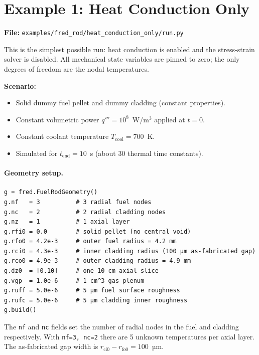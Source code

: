 \documentclass[11pt,a4paper]{article}
\begin{document}
\section{Example 1: Heat Conduction Only}
\label{sec:hco}

\textbf{File:} \texttt{examples/fred\_rod/heat\_conduction\_only/run.py}

\medskip
This is the simplest possible run: heat conduction is enabled and the
stress-strain solver is disabled.  All mechanical state variables are pinned
to zero; the only degrees of freedom are the nodal temperatures.

\textbf{Scenario:}
\begin{itemize}
  \item Solid dummy fuel pellet and dummy cladding (constant properties).
  \item Constant volumetric power $q''' = 10^8$~W/m$^3$ applied at $t=0$.
  \item Constant coolant temperature $T_\text{cool} = 700$~K.
  \item Simulated for $t_\text{end} = 10$~s (about 30 thermal time constants).
\end{itemize}

\paragraph{Geometry setup.}

\begin{lstlisting}
g = fred.FuelRodGeometry()
g.nf   = 3          # 3 radial fuel nodes
g.nc   = 2          # 2 radial cladding nodes
g.nz   = 1          # 1 axial layer
g.rfi0 = 0.0        # solid pellet (no central void)
g.rfo0 = 4.2e-3     # outer fuel radius = 4.2 mm
g.rci0 = 4.3e-3     # inner cladding radius (100 µm as-fabricated gap)
g.rco0 = 4.9e-3     # outer cladding radius = 4.9 mm
g.dz0  = [0.10]     # one 10 cm axial slice
g.vgp  = 1.0e-6     # 1 cm^3 gas plenum
g.ruff = 5.0e-6     # 5 µm fuel surface roughness
g.rufc = 5.0e-6     # 5 µm cladding inner roughness
g.build()
\end{lstlisting}

The \texttt{nf} and \texttt{nc} fields set the number of radial nodes in the
fuel and cladding respectively.  With \texttt{nf=3, nc=2} there are 5 unknown
temperatures per axial layer.  The as-fabricated gap width is
$r_\text{ci0} - r_\text{fo0} = 100$~µm.
\end{document}
